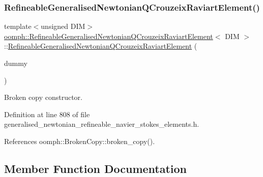 \subsubsection{\texorpdfstring{Refineable\+Generalised\+Newtonian\+Q\+Crouzeix\+Raviart\+Element()}{RefineableGeneralisedNewtonianQCrouzeixRaviartElement()}\hspace{0.1cm}{\footnotesize\ttfamily [2/2]}}
{\footnotesize\ttfamily template$<$unsigned D\+IM$>$ \\
\hyperlink{classoomph_1_1RefineableGeneralisedNewtonianQCrouzeixRaviartElement}{oomph\+::\+Refineable\+Generalised\+Newtonian\+Q\+Crouzeix\+Raviart\+Element}$<$ D\+IM $>$\+::\hyperlink{classoomph_1_1RefineableGeneralisedNewtonianQCrouzeixRaviartElement}{Refineable\+Generalised\+Newtonian\+Q\+Crouzeix\+Raviart\+Element} (\begin{DoxyParamCaption}\item[{const \hyperlink{classoomph_1_1RefineableGeneralisedNewtonianQCrouzeixRaviartElement}{Refineable\+Generalised\+Newtonian\+Q\+Crouzeix\+Raviart\+Element}$<$ D\+IM $>$ \&}]{dummy }\end{DoxyParamCaption})\hspace{0.3cm}{\ttfamily [inline]}}



Broken copy constructor. 



Definition at line 808 of file generalised\+\_\+newtonian\+\_\+refineable\+\_\+navier\+\_\+stokes\+\_\+elements.\+h.



References oomph\+::\+Broken\+Copy\+::broken\+\_\+copy().



\subsection{Member Function Documentation}
\mbox{\label{classoomph_1_1RefineableGeneralisedNewtonianQCrouzeixRaviartElement_ab98f5825068568b99dd2f744a3e2afb3}} 

